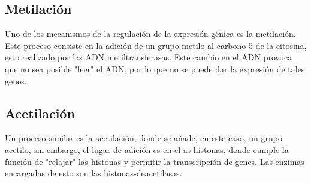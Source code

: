 \subsection{Metilación}

Uno de los mecanismos de la regulación de la expresión génica es la metilación. Este proceso consiste en la adición de un grupo metilo al carbono 5 de la citosina, esto realizado por las ADN metiltransferasas. Este cambio en el ADN  provoca  que no sea posible "leer" el ADN, por lo que no se puede dar la expresión de tales genes.

\subsection{Acetilación}\label{sec:acetilación}

Un proceso similar es la acetilación, donde se añade, en este caso, un grupo acetilo, sin embargo, el lugar de adición es en el as histonas, donde cumple la función de "relajar" las histonas y permitir la transcripción de genes. Las enzimas encargadas de esto son las histonas-deacetilasas.

